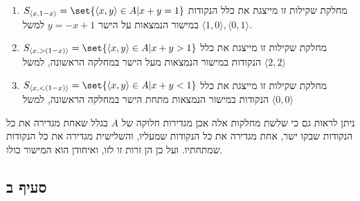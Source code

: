 \documentclass{article}
\DeclarePairedDelimiter\set\{\}
\begin{document}
\begin{enumerate}
	\item $S_{\langle x, 1-x \rangle} = \set{\langle x, y \rangle \in A | x + y = 1}$
	 מחלקת שקילות זו מייצגת את כלל הנקודות במישור הנמצאות על הישר $y = -x + 1$ למשל $\langle 1, 0 \rangle, \langle 0, 1 \rangle$.
	 \item $S_{\langle x, >(1-x) \rangle} = \set{\langle x, y \rangle \in A| x + y > 1}$
	 מחלקת שקילות זו מייצגת את כלל הנקודות במישור הנמצאות מעל הישר במחלקה הראשונה, למשל $\langle 2, 2 \rangle$
	 \item $S_{\langle x, <(1-x) \rangle} = \set{\langle x, y \rangle \in A| x + y < 1}$
	 מחלקת שקילות זו מייצגת את כלל הנקודות במישור הנמצאות מתחת הישר במחלקה הראשונה, למשל $\langle 0, 0 \rangle$
\end{enumerate}
ניתן לראות גם כי שלשת מחלקות אלה אכן מגדירות חלוקה של $A$ בגלל שאחת מגדירה את כל הנקודות שבקו ישר, אחת מגדירה את כל הנקודות שמעליו, והשלישית מגדירה את כל הנקודות שמתחתיו.
ועל כן הן זרות זו לזו, ואיחודן הוא המישור כולו.
\subsection*{סעיף ב}
\end{document}
